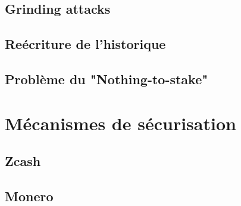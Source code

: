 \subsection{Grinding attacks}
\subsection{Reécriture de l'historique}
\subsection{Problème du "Nothing-to-stake"}

\section{Mécanismes de sécurisation}

\subsection{Zcash}
\subsection{Monero}